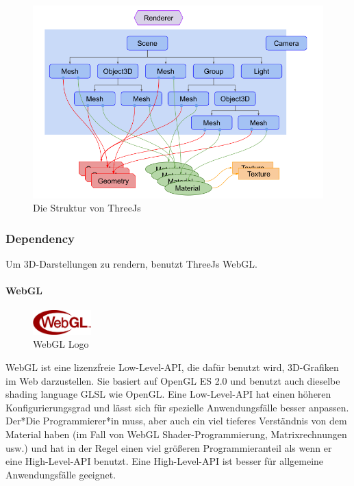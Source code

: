 \cite[ThreeJs fundamentals]{ThreeJsFund}

\begin{figure} [h t]
    \centering
    \includegraphics[scale=0.5]{pics/threejs-structure.png}
    \caption{Die Struktur von ThreeJs \cite{ThreeJsFund}}
    \label{fig:tech:front:threejsstructure}
\end{figure}

\subsubsection{Dependency}
\label{ch::ThreeJsDependency}
Um 3D-Darstellungen zu rendern, benutzt ThreeJs WebGL.

\paragraph{WebGL}
\label{ch::webgl}
\begin{figure}
    \begin{center}
      \includegraphics[width=0.2\textwidth]{pics/WebGL_Logo.png}
     \caption{WebGL Logo}
    \end{center}
\end{figure}
WebGL ist eine lizenzfreie Low-Level-API, die dafür benutzt wird, 3D-Grafiken im Web darzustellen. Sie basiert auf OpenGL ES 2.0 und benutzt auch dieselbe shading language GLSL wie OpenGL. Eine Low-Level-API hat einen höheren Konfigurierungsgrad und lässt sich für spezielle Anwendungsfälle besser anpassen. Der*Die Programmierer*in muss, aber auch ein viel tieferes Verständnis von dem Material haben (im Fall von WebGL Shader-Programmierung, Matrixrechnungen usw.) und hat in der Regel einen viel größeren Programmieranteil als wenn er eine High-Level-API benutzt. Eine High-Level-API  ist besser für allgemeine Anwendungsfälle geeignet.
\cite[WebGl Getting Started]{WebglGettingStarted} \cite{HighlowAPI}

